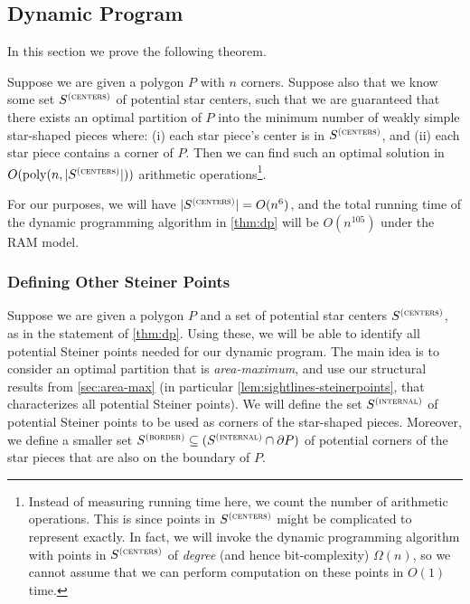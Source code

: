\documentclass{theoretics}
\newcommand\Scen{S^{\textsc{(centers)}}}
\newcommand\Sint{S^{\textsc{(internal)}}}
\newcommand\Sbor{S^{\textsc{(border)}}}
\newcommand\poly{\mathrm{poly}}
\begin{document}
\subsection{Dynamic Program} \label{sec:dp}

In this section we prove the following theorem.

\begin{theorem}
\label{thm:dp}
Suppose we are given a polygon $P$ with $n$ corners. Suppose also that we know some set $\Scen$ of potential star centers, such that we are guaranteed that there exists an optimal partition of $P$ into the minimum number of weakly simple star-shaped pieces where: (i) each star piece's center is in $\Scen$, and (ii) each star piece contains a corner of $P$.
Then we can find such an optimal solution in $O(\poly(n,|\Scen|))$ arithmetic operations\footnote{Instead of measuring running time here, we count the number of arithmetic operations. This is since points in $\Scen$ might be complicated to represent exactly. In fact, we will invoke the dynamic programming algorithm with points in $\Scen$ of \emph{degree} (and hence bit-complexity) $\Omega(n)$, so we cannot assume that we can perform computation on these points in $O(1)$ time.}.
\end{theorem}

\begin{remark}
\label{rem:dp}
For our purposes, we will have $|\Scen| = O(n^6)$, and the total running time of the dynamic programming algorithm in \cref{thm:dp} will be $O(n^{105})$ under the RAM model. 
\end{remark}

\subsubsection{Defining Other Steiner Points}
Suppose we are given a polygon $P$ and a set of potential star centers $\Scen$, as in the statement of \cref{thm:dp}. Using these, we will be able to identify all potential Steiner points needed for our dynamic program.
The main idea is to consider an optimal partition that is \emph{area-maximum}, and use our structural results from \cref{sec:area-max} (in particular \cref{lem:sightlines-steinerpoints}, that characterizes all potential Steiner points).
We will define the set $\Sint$ of potential Steiner points to be used as corners of the star-shaped pieces. Moreover, we define a smaller set $\Sbor\subseteq (\Sint\cap \partial P)$ of potential corners of the star pieces that are also on the boundary of $P$. 
\end{document}

